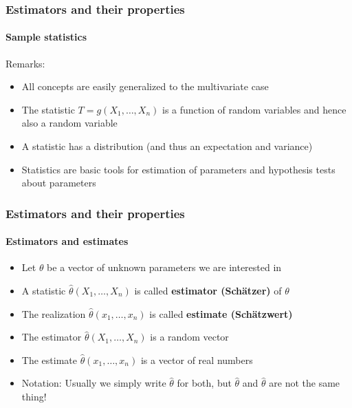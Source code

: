 \documentclass[notes=show]{beamer}
\begin{document}
\begin{frame}\frametitle{Estimators and their properties}\framesubtitle{Sample statistics}
Remarks:
\begin{itemize}
    \item All concepts are easily generalized to the multivariate case
    \item The statistic $T=g(X_{1},\ldots ,X_{n})$ is a function of random variables and hence also a random variable
    \item A statistic has a distribution (and thus an expectation and variance)
    \item Statistics are basic tools for estimation of parameters and hypothesis tests about parameters
\end{itemize}
\end{frame}


\begin{frame}\frametitle{Estimators and their properties}\framesubtitle{Estimators and estimates}
\begin{itemize}
    \item Let $\theta $ be a vector of unknown parameters we are interested in
    \item A statistic $\hat{\theta}(X_{1},\ldots ,X_{n})$ is called \textbf{estimator (Sch\"{a}tzer)} of $\theta $
    \item The realization $\hat{\theta}(x_{1},\ldots ,x_{n})$ is called \textbf{estimate (Sch\"{a}tzwert)}
    \item The estimator $\hat{\theta}(X_{1},\ldots ,X_{n})$ is a random vector
    \item The estimate $\hat{\theta}(x_{1},\ldots ,x_{n})$ is a vector of real numbers
    \item Notation: Usually we simply write $\hat{\theta}$ for both, but $\hat{\theta}$ and $\hat{\theta}$ are not the same thing!
\end{itemize}
\end{frame}
\end{document}
